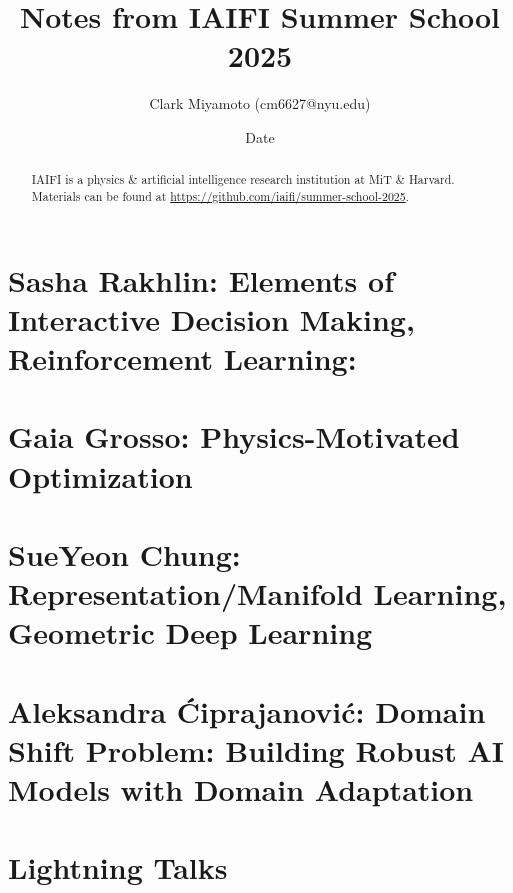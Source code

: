 \documentclass[12pt,fleqn]{article}
\title{Notes from IAIFI Summer School 2025}
\author{Clark Miyamoto (cm6627@nyu.edu)}
\date{Date}
\numberwithin{equation}{section} %
\begin{document}
\maketitle
\begin{abstract}
	IAIFI is a physics \& artificial intelligence research institution at MiT \& Harvard. Materials can be found at \url{https://github.com/iaifi/summer-school-2025}.
\end{abstract}
\tableofcontents



\newpage
\part{Sasha Rakhlin: Elements of Interactive Decision Making, Reinforcement Learning:}


\newpage
\part{Gaia Grosso: Physics-Motivated Optimization}


\newpage
\part{SueYeon Chung: Representation/Manifold Learning, Geometric Deep Learning}

\newpage
\part{Aleksandra \'Ciprajanovi\'c: Domain Shift Problem: Building Robust AI Models with Domain Adaptation}

\newpage
\part{Lightning Talks}

\end{document}
